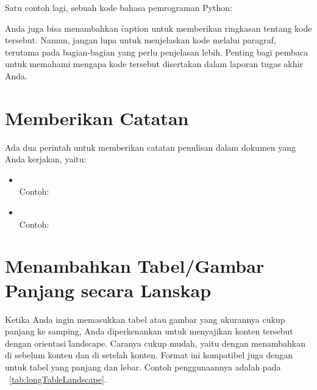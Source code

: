 Satu contoh lagi, sebuah kode bahasa pemrograman Python:


Anda juga bisa menambahkan \f{caption} untuk memberikan ringkasan tentang kode tersebut.
Namun, jangan lupa untuk menjelaskan kode melalui paragraf, terutama pada bagian-bagian yang perlu penjelasan lebih.
Penting bagi pembaca untuk memahami mengapa kode tersebut disertakan dalam laporan tugas akhir Anda.


\section{Memberikan Catatan}
\label{sec:note}
Ada dua perintah untuk memberikan catatan penulisan dalam dokumen yang Anda kerjakan, yaitu:
\begin{itemize}
	\item {} \\
	Contoh: \\ 
	\item {} \\
	Contoh: \todoCite
\end{itemize}


\section{Menambahkan Tabel/Gambar Panjang secara Lanskap}
\label{sec:landscape}
Ketika Anda ingin memasukkan tabel atau gambar yang ukurannya cukup panjang ke samping, Anda diperkenankan untuk menyajikan konten tersebut dengan orientasi \f{landscape}. Caranya cukup mudah, yaitu dengan menambahkan  di sebelum konten dan  di setelah konten. Format ini kompatibel juga dengan  untuk tabel yang panjang dan lebar. Contoh penggunaannya adalah pada \tab~\ref{tab:longTableLandscape}.

